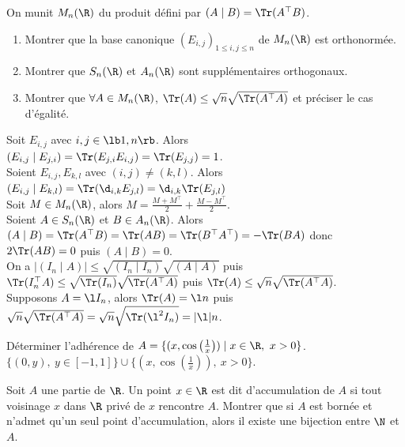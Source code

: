 \documentclass[11pt]{article}
\begin{document}
\vspace*{-0.7cm}

\begin{exercice}{}{}
    On munit $M_n(\R)$ du produit défini par $(A\mid B)=\Tr(A^\top B)$.
    \begin{enumerate}
        \item Montrer que la base canonique $(E_{i,j})_{1\leq i,j \leq n}$ de $M_n(\R)$ est orthonormée.
        \item Montrer que $S_n(\R)$ et $A_n(\R)$ sont supplémentaires orthogonaux.
        \item Montrer que $\forall A \in M_n(\R)$, $\Tr(A)\leq\sqrt{n}\sqrt{\Tr(A^\top A)}$ et préciser le cas d'égalité.
    \end{enumerate}
    \tcblower
     Soit $E_{i,j}$ avec $i,j\in\lb1,n\rb$. Alors $(E_{i,j}\mid E_{j,i})=\Tr(E_{j,i}E_{i,j})=\Tr(E_{j,j})=1$.\\
    Soient $E_{i,j},E_{k,l}$ avec $(i,j)\neq(k,l)$. Alors $(E_{i,j}\mid E_{k,l})=\Tr(\d_{i,k}E_{j,l})=\d_{i,k}\Tr(E_{j,l})$\\
     Soit $M\in M_n(\R)$, alors $M=\frac{M+M^\top}{2}+\frac{M-M^\top}{2}$.\\
    Soient $A\in S_n(\R)$ et $B\in A_n(\R)$. Alors $(A\mid B) = \Tr(A^\top B)=\Tr(AB)=\Tr(B^\top A^\top)=-\Tr(BA)$ donc $2\Tr(AB)=0$ puis $(A\mid B)=0$.\\
     On a $|(I_n\mid A)|\leq\sqrt{(I_n \mid I_n)}\sqrt{(A\mid A)}$ puis $\Tr(I_n^\top A) \leq \sqrt{\Tr(I_n)}\sqrt{\Tr(A^\top A)}$ puis $\Tr(A)\leq\sqrt{n}\sqrt{\Tr(A^\top A)}$.\\
    Supposons $A=\l I_n$, alors $\Tr(A)=\l n$ puis $\sqrt{n}\sqrt{\Tr(A^\top A)}=\sqrt{n}\sqrt{\Tr(\l^2 I_n)}=|\l|n$.
\end{exercice}

\begin{exercice}{}{}
    Déterminer l'adhérence de $A=\{(x,\cos\left( \frac{1}{x} \right)) \mid x\in\R, ~ x > 0\}$.
    \tcblower
    $\{(0,y), ~ y \in [-1,1]\}\cup\{(x,\cos(\frac{1}{x})), ~ x > 0\}$.
\end{exercice}

\begin{exercice}{}{}
    \small Soit $A$ une partie de $\R$. Un point $x\in\R$ est dit d'accumulation de $A$ si tout voisinage $x$ dans $\R$ privé de $x$ rencontre $A$. Montrer que si $A$ est bornée et n'admet qu'un seul point d'accumulation, alors il existe une bijection entre $\N$ et $A$.
\end{exercice}
\end{document}
